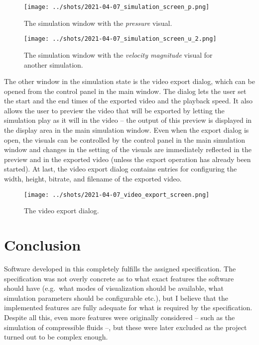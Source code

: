 \documentclass[11pt,a4paper,twoside,openright]{report}
\begin{document}
\begin{figure}[h]
	\centering
	\texttt{[image: ../shots/2021-04-07\_simulation\_screen\_p.png]}
	\caption{The simulation window with the \emph{pressure} visual.}
\end{figure}

\begin{figure}[h]
	\centering
	\texttt{[image: ../shots/2021-04-07\_simulation\_screen\_u\_2.png]}
	\caption{The simulation window with the \emph{velocity magnitude} visual for another simulation.}
\end{figure}

The other window in the simulation state is the video export dialog, which can be opened from the control panel in the main window. The dialog lets the user set the start and the end times of the exported video and the playback speed. It also allows the user to preview the video that will be exported by letting the simulation play as it will in the video -- the output of this preview is displayed in the display area in the main simulation window. Even when the export dialog is open, the visuals can be controlled by the control panel in the main simulation window and changes in the setting of the visuals are immediately reflected in the preview and in the exported video (unless the export operation has already been started). At last, the video export dialog contains entries for configuring the width, height, bitrate, and filename of the exported video.

\begin{figure}[h]
	\centering
	\texttt{[image: ../shots/2021-04-07\_video\_export\_screen.png]}
	\caption{The video export dialog.}
\end{figure}

\chapter*{Conclusion}

\pagestyle{empty}

Software developed in this \this{} completely fulfills the assigned specification. The specification was not overly concrete as to what exact features the software should have (e.g.\ what modes of visualization should be available, what simulation parameters should be configurable etc.), but I believe that the implemented features are fully adequate for what is required by the specification. Despite all this, even more features were originally considered -- such as the simulation of compressible fluids --, but these were later excluded as the project turned out to be complex enough.
\end{document}
